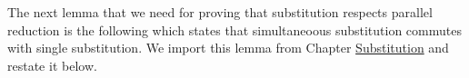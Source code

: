 \begin{fence}
\begin{code}%
\>[0]\AgdaSpace{}%
\AgdaSymbol{:}\AgdaSpace{}%
\AgdaSpace{}%
\AgdaSymbol{\}}\AgdaSpace{}%
\AgdaSymbol{\{}\AgdaSpace{}%
\AgdaSpace{}%
\AgdaSymbol{:}\AgdaSpace{}%
\AgdaSpace{}%
\AgdaSpace{}%
\AgdaSymbol{\}}\<%
\\
\>[0][@{}l@{\AgdaIndent{0}}]%
\>[2]%
\>[624I]\AgdaSpace{}%
\AgdaSpace{}%
\<%
\\
\>[.][@{}l@{}]\<[624I]%
\>[4]\AgdaComment{------------------------------------------}\<%
\\
%
\>[2]\AgdaSpace{}%
\AgdaSymbol{\}}\AgdaSpace{}%
\AgdaSpace{}%
\AgdaSpace{}%
\AgdaSymbol{(}\AgdaSpace{}%
\AgdaSpace{}%
\AgdaSymbol{\{}\AgdaSpace{}%
\AgdaSymbol{=}\AgdaSpace{}%
\AgdaSymbol{\})}\AgdaSpace{}%
\AgdaSymbol{(}\AgdaSpace{}%
\AgdaSymbol{)}\<%
\\
\>[0]\AgdaSpace{}%
\AgdaSpace{}%
\AgdaSymbol{\{}\AgdaSpace{}%
\AgdaSymbol{=}\AgdaSpace{}%
\AgdaSymbol{\}}\AgdaSpace{}%
\AgdaSymbol{=}\AgdaSpace{}%
\<%
\\
\>[0]\AgdaSpace{}%
\AgdaSpace{}%
\AgdaSymbol{\{}\AgdaSpace{}%
\AgdaSymbol{=}\AgdaSpace{}%
\AgdaSpace{}%
\AgdaSymbol{\}}\AgdaSpace{}%
\AgdaSymbol{=}\AgdaSpace{}%
\AgdaSpace{}%
\<%
\end{code}
\end{fence}

The next lemma that we need for proving that substitution respects
parallel reduction is the following which states that simultaneoous
substitution commutes with single substitution. We import this lemma
from Chapter \protect\hyperlink{Substitution}{Substitution} and restate
it below.


